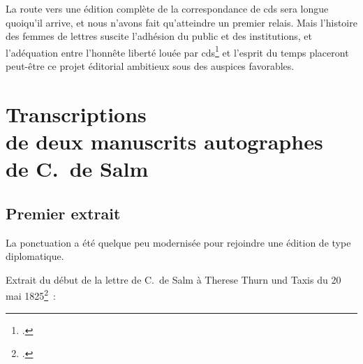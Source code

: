 \documentclass[a4paper,12pt,twoside]{book}
\begin{document}
		La route vers une édition complète de la correspondance de \gls{cds} sera longue quoiqu'il arrive, et nous n'avons fait qu'atteindre un premier relais. Mais l'histoire des femmes de lettres suscite l'adhésion du public et des institutions, et l'adéquation entre l'\og honnête liberté \fg louée par \gls{cds}\footcite{CdS02045046} et l'esprit du temps placeront peut-être ce projet éditorial ambitieux sous des auspices favorables.
		
	\pagestyle{empty}
	\cleardoublepage
				
	\appendix
	
	\renewcommand{\appendixpagename}{Annexes}
	
	\renewcommand{\appendixtocname}{Annexes}
	
	\addappheadtotoc%
	
	\appendixpage %
	
	\cleardoublepage
	\pagestyle{plain}			
	
	\chapter{Transcriptions \\de deux manuscrits autographes \\de C.~de Salm}
		\label{autographes}
		
		\section{Premier extrait}
	
			La ponctuation a été quelque peu modernisée pour rejoindre une édition de type diplomatique.
		
			Extrait du début de la lettre de C.~de Salm à Therese Thurn und Taxis du 20 mai 1825\footcite{CdS67022030}~:
			
\end{document}
